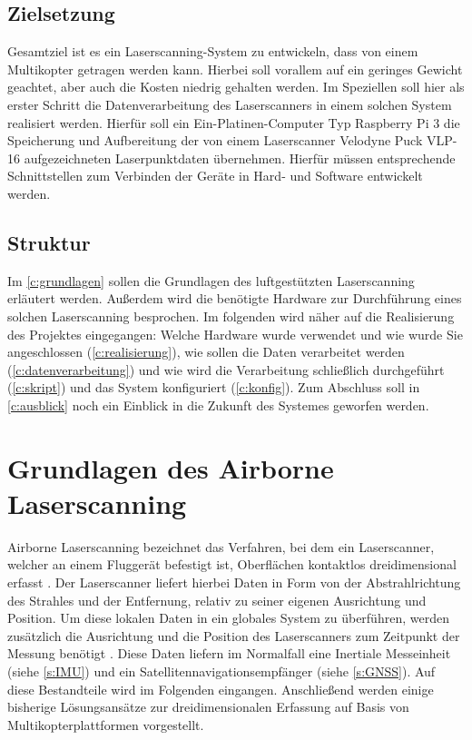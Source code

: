 \documentclass[a4paper,12pt,bibliography=totoc, listof=totoc,titlepage,pointlessnumbers]{scrreprt}
\begin{document}
\section{Zielsetzung}
Gesamtziel ist es ein Laserscanning-System zu entwickeln, dass von einem Multikopter getragen werden kann. Hierbei soll vorallem auf ein geringes Gewicht geachtet, aber auch die Kosten niedrig gehalten werden. Im Speziellen soll hier als erster Schritt die Datenverarbeitung des Laserscanners in einem solchen System realisiert werden. Hierfür soll ein Ein-Platinen-Computer Typ Raspberry Pi 3 die Speicherung und Aufbereitung der von einem Laserscanner Velodyne Puck VLP-16 aufgezeichneten Laserpunktdaten übernehmen. Hierfür müssen entsprechende Schnittstellen zum Verbinden der Geräte in Hard- und Software entwickelt werden.

\section{Struktur}
Im \autoref{c:grundlagen} sollen die Grundlagen des luftgestützten Laserscanning erläutert werden. Außerdem wird die benötigte Hardware zur Durchführung eines solchen Laserscanning besprochen. Im folgenden wird näher auf die Realisierung des Projektes eingegangen: Welche Hardware wurde verwendet und wie wurde Sie angeschlossen (\autoref{c:realisierung}), wie sollen die Daten verarbeitet werden (\autoref{c:datenverarbeitung}) und wie wird die Verarbeitung schließlich durchgeführt (\autoref{c:skript}) und das System konfiguriert (\autoref{c:konfig}). Zum Abschluss soll in \autoref{c:ausblick} noch ein Einblick in die Zukunft des Systemes geworfen werden.

\chapter{Grundlagen des Airborne Laserscanning}
\label{c:grundlagen}

Airborne Laserscanning bezeichnet das Verfahren, bei dem ein Laserscanner, welcher an einem Fluggerät befestigt ist, Oberflächen kontaktlos dreidimensional erfasst \citep[S. 1]{beraldin}. Der Laserscanner liefert hierbei Daten in Form von der Abstrahlrichtung des Strahles und der Entfernung, relativ zu seiner eigenen Ausrichtung und Position. Um diese lokalen Daten in ein globales System zu überführen, werden zusätzlich die Ausrichtung und die Position des Laserscanners zum Zeitpunkt der Messung benötigt \citep[S. 22f]{beraldin}. Diese Daten liefern im Normalfall eine Inertiale Messeinheit (siehe \autoref{s:IMU}) und ein Satellitennavigationsempfänger (siehe \autoref{s:GNSS}). Auf diese Bestandteile wird im Folgenden eingangen. Anschließend werden einige bisherige Lösungsansätze zur dreidimensionalen Erfassung auf Basis von Multikopterplattformen vorgestellt.
\end{document}

